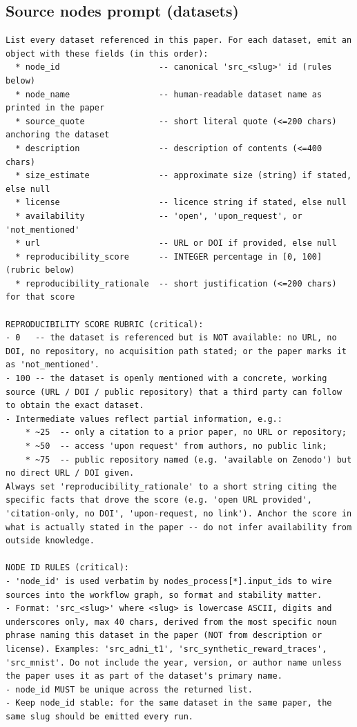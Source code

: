 \documentclass{article}
\begin{document}
\subsection{Source nodes prompt (datasets)}
\label{app:prompts:source-nodes}

\begin{lstlisting}
List every dataset referenced in this paper. For each dataset, emit an object with these fields (in this order):
  * node_id                    -- canonical 'src_<slug>' id (rules below)
  * node_name                  -- human-readable dataset name as printed in the paper
  * source_quote               -- short literal quote (<=200 chars) anchoring the dataset
  * description                -- description of contents (<=400 chars)
  * size_estimate              -- approximate size (string) if stated, else null
  * license                    -- licence string if stated, else null
  * availability               -- 'open', 'upon_request', or 'not_mentioned'
  * url                        -- URL or DOI if provided, else null
  * reproducibility_score      -- INTEGER percentage in [0, 100] (rubric below)
  * reproducibility_rationale  -- short justification (<=200 chars) for that score

REPRODUCIBILITY SCORE RUBRIC (critical):
- 0   -- the dataset is referenced but is NOT available: no URL, no DOI, no repository, no acquisition path stated; or the paper marks it as 'not_mentioned'.
- 100 -- the dataset is openly mentioned with a concrete, working source (URL / DOI / public repository) that a third party can follow to obtain the exact dataset.
- Intermediate values reflect partial information, e.g.:
    * ~25  -- only a citation to a prior paper, no URL or repository;
    * ~50  -- access 'upon request' from authors, no public link;
    * ~75  -- public repository named (e.g. 'available on Zenodo') but no direct URL / DOI given.
Always set 'reproducibility_rationale' to a short string citing the specific facts that drove the score (e.g. 'open URL provided', 'citation-only, no DOI', 'upon-request, no link'). Anchor the score in what is actually stated in the paper -- do not infer availability from outside knowledge.

NODE ID RULES (critical):
- 'node_id' is used verbatim by nodes_process[*].input_ids to wire sources into the workflow graph, so format and stability matter.
- Format: 'src_<slug>' where <slug> is lowercase ASCII, digits and underscores only, max 40 chars, derived from the most specific noun phrase naming this dataset in the paper (NOT from description or license). Examples: 'src_adni_t1', 'src_synthetic_reward_traces', 'src_mnist'. Do not include the year, version, or author name unless the paper uses it as part of the dataset's primary name.
- node_id MUST be unique across the returned list.
- Keep node_id stable: for the same dataset in the same paper, the same slug should be emitted every run.
\end{lstlisting}
\end{document}
